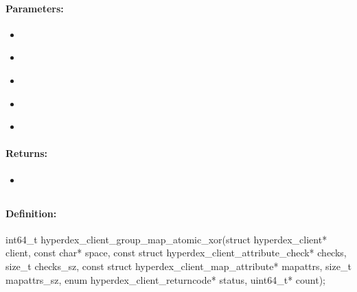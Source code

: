 \paragraph{Parameters:}
\begin{itemize}[noitemsep]
\item {}\\

\item {}\\

\item {}\\

\item {}\\

\item {}\\

\end{itemize}

\paragraph{Returns:}
\begin{itemize}[noitemsep]
\item {}\\

\end{itemize}

\pagebreak
\subsection{}
\label{api:c:group_map_atomic_xor}


\paragraph{Definition:}
\begin{ccode}
int64_t hyperdex_client_group_map_atomic_xor(struct hyperdex_client* client,
        const char* space,
        const struct hyperdex_client_attribute_check* checks, size_t checks_sz,
        const struct hyperdex_client_map_attribute* mapattrs, size_t mapattrs_sz,
        enum hyperdex_client_returncode* status,
        uint64_t* count);
\end{ccode}

